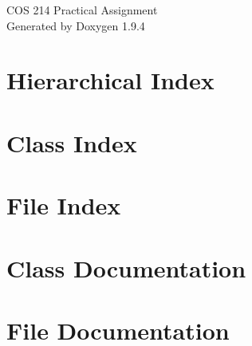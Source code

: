 \documentclass[twoside]{book}
\newcommand{\+}{\discretionary{\mbox{\scriptsize$\hookleftarrow$}}{}{}}
\newcommand{\clearemptydoublepage}{%
    \newpage{\pagestyle{empty}\cleardoublepage}%
  }
\begin{document}
  \raggedbottom
    \hypersetup{pageanchor=false,
                bookmarksnumbered=true,
                pdfencoding=unicode
               }
  \begin{titlepage}
  \vspace*{7cm}
  \begin{center}%
  {\Large COS 214 Practical Assignment}\\
  \vspace*{1cm}
  {\large Generated by Doxygen 1.9.4}\\
  \end{center}
  \end{titlepage}
  \clearemptydoublepage
  \tableofcontents
  \clearemptydoublepage
  \hypersetup{pageanchor=true}
\chapter{Hierarchical Index}

\chapter{Class Index}

\chapter{File Index}

\chapter{Class Documentation}











\chapter{File Documentation}
















  \backmatter
  \newpage
  \clearemptydoublepage
  \printindex
\end{document}
